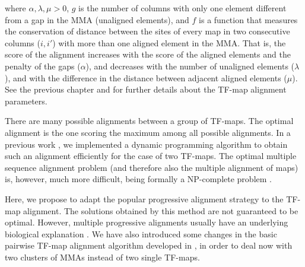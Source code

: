 \begin{center}
\end{center}

\noindent where $\alpha,\lambda,\mu>0$, $g$ is the number of columns with only one
element different from a gap in the MMA (unaligned elements), and
$f$ is a function that measures the conservation of distance between the
sites of every map in two consecutive columns ($i,i'$) with more than one aligned element in the 
MMA. That is, the score of the alignment increases with the score of the aligned elements 
and the penalty of the gaps ($\alpha$), and decreases with the number of unaligned
elements ($\lambda$), and with the difference in the distance between adjacent aligned 
elements ($\mu$). See the previous chapter and \citet{blanco:2006b} for further details 
about the TF-map alignment parameters.


There are many possible alignments between a group of TF-maps. The optimal
alignment is the one scoring the maximum among all possible alignments. In
a previous work \citep{blanco:2006b}, we implemented a dynamic programming
algorithm to obtain such an alignment efficiently for the case of two
TF-maps. The optimal multiple sequence alignment problem (and therefore
also the multiple alignment of maps) is, however, much more difficult, being 
formally a NP-complete problem \citep{wang:1994a}.

Here, we propose to adapt the popular progressive alignment strategy to
the TF-map alignment. The solutions obtained by this method are
not guaranteed to be optimal. However, multiple progressive alignments 
usually have an underlying biological explanation \citep{thompson:1994a}. 
We have also introduced some changes in the basic pairwise TF-map alignment 
algorithm developed in \citep{blanco:2006b}, in order to deal now with two 
clusters of MMAs instead of two single TF-maps. 

